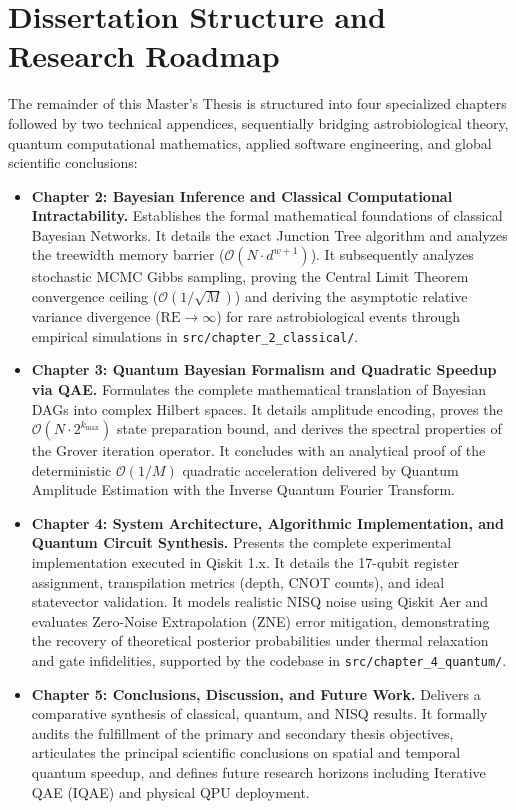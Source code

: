 \section{Dissertation Structure and Research Roadmap}\label{sec:dissertation_structure}

The remainder of this Master's Thesis is structured into four specialized chapters followed by two technical appendices, sequentially bridging astrobiological theory, quantum computational mathematics, applied software engineering, and global scientific conclusions:

\begin{itemize}
    \item \textbf{Chapter 2: Bayesian Inference and Classical Computational Intractability.} Establishes the formal mathematical foundations of classical Bayesian Networks. It details the exact Junction Tree algorithm and analyzes the treewidth memory barrier ($\mathcal{O}(N \cdot d^{w+1})$). It subsequently analyzes stochastic MCMC Gibbs sampling, proving the Central Limit Theorem convergence ceiling ($\mathcal{O}(1/\sqrt{M})$) and deriving the asymptotic relative variance divergence ($\mathrm{RE} \to \infty$) for rare astrobiological events through empirical simulations in \texttt{src/chapter\_2\_classical/}.
    \item \textbf{Chapter 3: Quantum Bayesian Formalism and Quadratic Speedup via QAE.} Formulates the complete mathematical translation of Bayesian DAGs into complex Hilbert spaces. It details amplitude encoding, proves the $\mathcal{O}(N \cdot 2^{k_{\max}})$ state preparation bound, and derives the spectral properties of the Grover iteration operator. It concludes with an analytical proof of the deterministic $\mathcal{O}(1/M)$ quadratic acceleration delivered by Quantum Amplitude Estimation with the Inverse Quantum Fourier Transform.
    \item \textbf{Chapter 4: System Architecture, Algorithmic Implementation, and Quantum Circuit Synthesis.} Presents the complete experimental implementation executed in Qiskit 1.x. It details the 17-qubit register assignment, transpilation metrics (depth, CNOT counts), and ideal statevector validation. It models realistic NISQ noise using Qiskit Aer and evaluates Zero-Noise Extrapolation (ZNE) error mitigation, demonstrating the recovery of theoretical posterior probabilities under thermal relaxation and gate infidelities, supported by the codebase in \texttt{src/chapter\_4\_quantum/}.
    \item \textbf{Chapter 5: Conclusions, Discussion, and Future Work.} Delivers a comparative synthesis of classical, quantum, and NISQ results. It formally audits the fulfillment of the primary and secondary thesis objectives, articulates the principal scientific conclusions on spatial and temporal quantum speedup, and defines future research horizons including Iterative QAE (IQAE) and physical QPU deployment.

\end{itemize}
